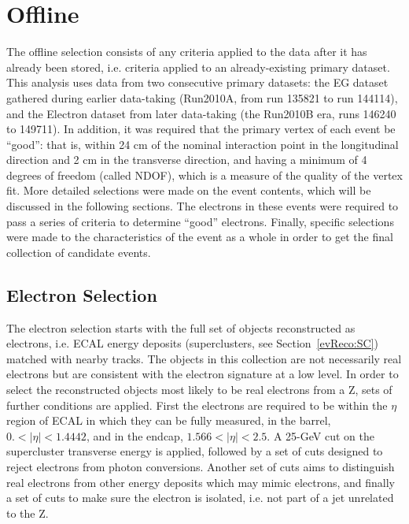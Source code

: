 \clearpage
\section{Offline}
\label{evSel:offline}
The offline selection consists of any criteria applied to the data 
after it has already been stored, 
i.e. criteria applied to an already-existing primary dataset.  
This analysis uses data from two consecutive primary datasets: 
the EG dataset gathered during earlier data-taking 
(Run2010A, from run 135821 to run 144114), 
and the Electron dataset from later data-taking 
(the Run2010B era, runs 146240 to 149711).  
In addition, it was required that the primary vertex of 
each event be ``good'': 
that is, within 24 cm of the nominal interaction point 
in the longitudinal direction
and 2 cm in the transverse direction, 
and having a minimum of 4 degrees of freedom (called NDOF),
which is a measure of the quality of the vertex fit.  %
More detailed selections were made on the event contents, 
which will be discussed in the following sections.  
The electrons in these events were required to pass 
a series of criteria to determine ``good'' electrons.  
Finally, specific selections were made to the 
characteristics of the event as a whole 
in order to get the final collection of \Zee candidate 
events.  

\subsection{Electron Selection}
\label{evSel:elec}
The electron selection starts with the full set of objects reconstructed as electrons, 
i.e. ECAL energy deposits (superclusters, see Section~\ref{evReco:SC}) matched with nearby tracks.  
The objects in this collection are not necessarily real electrons 
but are consistent with the electron signature at a low level.  
In order to select the reconstructed objects most likely to be real electrons from a Z, 
sets of further conditions are applied.  
First the electrons are required to be within the $\eta$ region of ECAL in which 
they can be fully measured, in the barrel, $0. < |\eta| < 1.4442$, 
and in the endcap, $1.566 < |\eta| < 2.5$.  
A 25-GeV cut on the supercluster transverse energy is applied,
followed by a set of cuts designed to reject electrons from photon conversions.  
Another set of cuts aims to distinguish real electrons from other energy deposits which may mimic electrons, 
and finally a set of cuts to make sure the electron is isolated, i.e. not part of a jet unrelated to the Z.  

